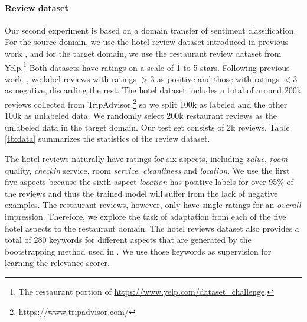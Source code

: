 \paragraph{Review dataset} Our second experiment is based on a domain transfer of sentiment classification. For the source domain, we use the hotel review dataset introduced in previous work \cite{wang2010latent,wang2011latent}, and for the target domain, we use the restaurant review dataset from Yelp.\footnote{The restaurant portion of \url{https://www.yelp.com/dataset_challenge}.} Both datasets have ratings on a scale of 1 to 5 stars. 
Following previous work~\cite{blitzer2007biographies}, we label reviews with ratings $>3$ as positive and those with ratings $<3$ as negative, discarding the rest. The hotel dataset includes a total of around 200k reviews collected from TripAdvisor,\footnote{\url{https://www.tripadvisor.com/}} so we split 100k as labeled and the other 100k as unlabeled data. We randomly select 200k restaurant reviews as the unlabeled data in the target domain. Our test set consists of 2k reviews. Table \ref{tb:data} summarizes the statistics of the review dataset.

The hotel reviews naturally have ratings for six aspects, including \emph{value}, \emph{room} quality, \emph{checkin} service, room \emph{service}, \emph{cleanliness} and \emph{location}. We use the first five aspects because the sixth aspect \emph{location} has positive labels for over 95\% of the reviews and thus the trained model will suffer from the lack of negative examples. The restaurant reviews, however, only have single ratings for an \emph{overall} impression. Therefore, we explore the task of adaptation  from each of the five hotel aspects to the restaurant domain. The hotel reviews dataset also provides a total of 280 keywords for different aspects that are generated by the bootstrapping method used in . We use those keywords as supervision for learning the relevance scorer.

